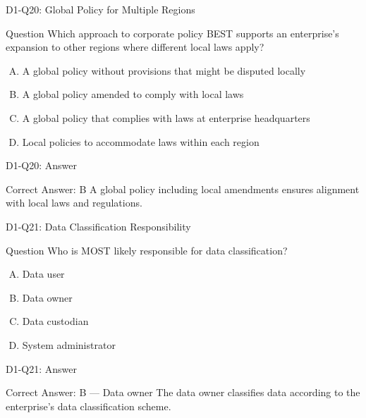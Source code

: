 \documentclass{beamer}
\begin{document}
	\begin{frame}{D1-Q20: Global Policy for Multiple Regions}
		\begin{block}{Question}
			Which approach to corporate policy BEST supports an enterprise's expansion to other regions where different local laws apply?
		\end{block}
		\begin{enumerate}[(A)]
			\item A global policy without provisions that might be disputed locally
			\item A global policy amended to comply with local laws
			\item A global policy that complies with laws at enterprise headquarters
			\item Local policies to accommodate laws within each region
		\end{enumerate}
	\end{frame}
	\begin{frame}{D1-Q20: Answer}
		\begin{block}{Correct Answer: B}
			A global policy including local amendments ensures alignment with local laws and regulations.
		\end{block}
	\end{frame}
	
	\begin{frame}{D1-Q21: Data Classification Responsibility}
		\begin{block}{Question}
			Who is MOST likely responsible for data classification?
		\end{block}
		\begin{enumerate}[(A)]
			\item Data user
			\item Data owner
			\item Data custodian
			\item System administrator
		\end{enumerate}
	\end{frame}
	\begin{frame}{D1-Q21: Answer}
		\begin{block}{Correct Answer: B --- Data owner}
			The data owner classifies data according to the enterprise's data classification scheme.
		\end{block}
	\end{frame}
	
\end{document}
